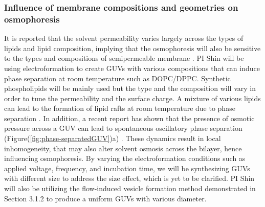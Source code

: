\documentclass[11pt]{article}
\begin{document}
\subsubsection{Influence of membrane compositions and geometries on osmophoresis\label{subsubsec:influence_membrane_compositions}}
 It is reported that the solvent permeability varies largely across the types of lipids and lipid composition, 
 implying that the osmophoresis will also be sensitive to the types and compositions of semipermeable membrane \cite{fettiplace1980,olbrich2000}.
 PI Shin will be using electroformation to create GUVs with various compositions that can induce phase separation at room temperature such as DOPC/DPPC. 
 Synthetic phospholipids will be mainly used but the type and the composition will vary in order to tune the permeability and the surface charge. 
  A mixture of various lipids can lead to the formation of lipid rafts at room temperature due to phase separation \cite{veatch2003}.
  In addition, a recent report has shown that the presence of osmotic pressure across a GUV can lead to spontaneous oscillatory phase separation (Figure(\ref{fig:phase-separatedGUV})a) \cite{oglkecka2014}.
  These dynamics result in local inhomogeneity, that may also alter solvent osmosis across the bilayer, hence influencing osmophoresis.
By varying the electroformation conditions such as applied voltage, frequency, and incubation time, we will be synthesizing 
GUVs with different size to address the size effect, which is yet to be clarified. 
PI Shin will also be utilizing the flow-induced vesicle formation method demonstrated in Section 3.1.2 to produce a uniform GUVs with various diameter.
\end{document}

